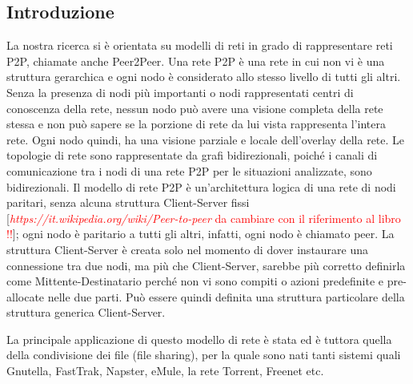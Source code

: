 \subsection{Introduzione}
La nostra ricerca si è orientata su modelli di reti in grado di rappresentare reti \acf{P2P}, chiamate anche Peer2Peer. Una rete P2P è una rete in cui non vi è una struttura gerarchica e ogni nodo è considerato allo stesso livello di tutti gli altri. Senza la presenza di nodi più importanti o nodi rappresentati centri di conoscenza della rete, nessun nodo può avere una visione completa della rete stessa e non può sapere se la porzione di rete da lui vista rappresenta l’intera rete. Ogni nodo quindi, ha una visione parziale e locale dell’overlay della rete. Le topologie di rete sono rappresentate da grafi bidirezionali, poiché i canali di comunicazione tra i nodi di una rete P2P per le situazioni analizzate, sono bidirezionali. Il modello di rete P2P è un’architettura logica di una rete di nodi paritari, senza alcuna struttura Client-Server fissi [\textcolor{red}{\textit{https://it.wikipedia.org/wiki/Peer-to-peer} da cambiare con il riferimento al libro !!}]; ogni nodo è paritario a tutti gli altri, infatti, ogni nodo è chiamato peer. La struttura Client-Server è creata solo nel momento di dover instaurare una connessione tra due nodi, ma più che Client-Server, sarebbe più corretto definirla come Mittente-Destinatario perché non vi sono compiti o azioni predefinite e pre-allocate nelle due parti. Può essere quindi definita una struttura particolare della struttura generica Client-Server.

La principale applicazione di questo modello di rete è stata ed è tuttora quella della condivisione dei file (file sharing), per la quale sono nati tanti sistemi quali Gnutella, FastTrak, Napster, eMule, la rete Torrent, Freenet etc.

